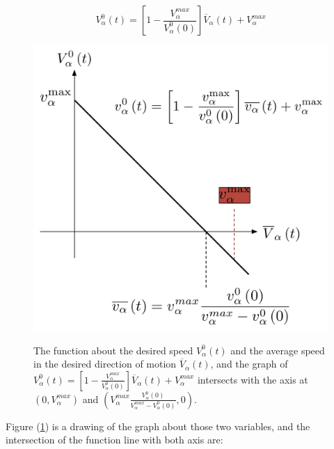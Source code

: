 \begin{itemize}
\begin{equation}\label{vv}
    V_{\alpha}^{0}(t) = \left[ 1 - \frac{V_{\alpha}^{max}}{V_{\alpha}^{0}(0)}\right]\overline{V}_{\alpha} \left( t \right) + V_{\alpha}^{max}
\end{equation}

\begin{figure}[ht]
\centering
{\includegraphics[scale=0.35]{Figures/impatience.pdf}} 
\caption{The function about the desired speed $ V_{\alpha}^{0}(t) $ 
and the average speed in the desired direction of motion $ \overline{V}_{\alpha} \left( t \right) $, and the graph of $ V_{\alpha}^{0}(t) = \left[ 1 - \frac{V_{\alpha}^{max}}{V_{\alpha}^{0}(0)}\right]\overline{V}_{\alpha} \left( t \right) + V_{\alpha}^{max} $ intersects with the axis at $ \left( 0 , V_{\alpha}^{max} 
\right)  $ and $ \left(V_{\alpha}^{max} 
		\frac{V_{\alpha}^{0} \left( 0 \right) }{V_{\alpha}^{max}-V_{\alpha}^{0} \left(0 \right)} , 0 
\right)  $.}
\label{fig:impatience}
\end{figure}

Figure (\ref{fig:impatience}) is a drawing of the graph about those two variables, and the intersection
 of the function line with both axis are:


\end{itemize}
